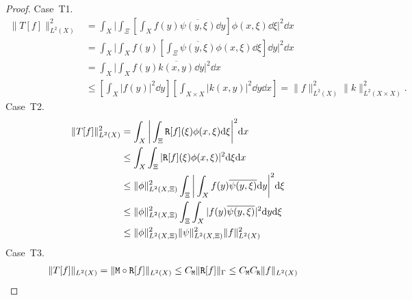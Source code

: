 \begin{proof}%
Case~T1.
\begin{align*}
    \| T[f] \|_{L^2(X)}^2
    &= \int_X \bigg| \int_\Xi \left[ \int_X f(y) \overline{\psi(y,\xi)} \dd y \right] \phi(x,\xi) \dd \xi \bigg|^2 \dd x\\
    &= \int_X \bigg| \int_X f(y) \left[ \int_\Xi \overline{\psi(y,\xi)} \phi(x,\xi) \dd \xi \right] \dd y \bigg|^2 \dd x\\
    &= \int_X \bigg| \int_X f(y) \overline{k(x,y)} \dd y \bigg|^2 \dd x\\
    &\le \left[ \int_X |f(y)|^2 \dd y \right] \left[ \int_{X \times X} |k(x,y)|^2 \dd y \dd x \right]
    = \| f \|_{L^2(X)}^2 \| k \|_{L^2(X \times X)}^2.
\end{align*}
Case~T2.
\begin{align*}
    \| T[f] \|_{L^2(X)}^2
    &= \int_X \bigg| \int_\Xi \mathtt{R}[f](\xi) \phi(x,\xi) \mathrm{d} \xi \bigg|^2 \mathrm{d} x\\
    &\le \int_X \int_\Xi |\mathtt{R}[f](\xi) \phi(x,\xi)|^2 \mathrm{d} \xi \mathrm{d} x\\
    &\le \| \phi \|_{L^2(X,\Xi)}^2 \int_\Xi \bigg| \int_X f(y) \overline{\psi(y,\xi)} \mathrm{d} y \bigg|^2 \mathrm{d} \xi\\
    &\le \| \phi \|_{L^2(X,\Xi)}^2 \int_\Xi \int_X |f(y) \overline{\psi(y,\xi)}|^2 \mathrm{d} y \mathrm{d} \xi\\
    &\le \| \phi \|_{L^2(X,\Xi)}^2 \| \psi \|_{L^2(X,\Xi)}^2 \|f \|_{L^2(X)}^2
\end{align*}
Case~T3.
\begin{align*}
    \| T[f] \|_{L^2(X)}
    &= \| \mathtt{M} \circ \mathtt{R}[f] \|_{L^2(X)}
    \le C_{\mathtt{M}} \| \mathtt{R}[f] \|_{\Gamma}
    \le C_{\mathtt{M}} C_{\mathtt{R}} \|f\|_{L^2(X)}
\end{align*}
\end{proof}

